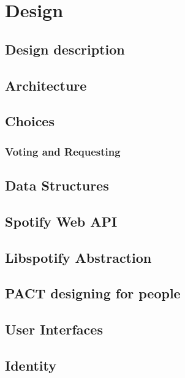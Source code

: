 \chapter{Design}


\section{Design description}


\section{Architecture}


\section{Choices}



\subsection{Voting and Requesting}


\section{Data Structures}




\section{Spotify Web API}


\section{Libspotify Abstraction}


\section{PACT designing for people}


\section{User Interfaces}


\section{Identity}

